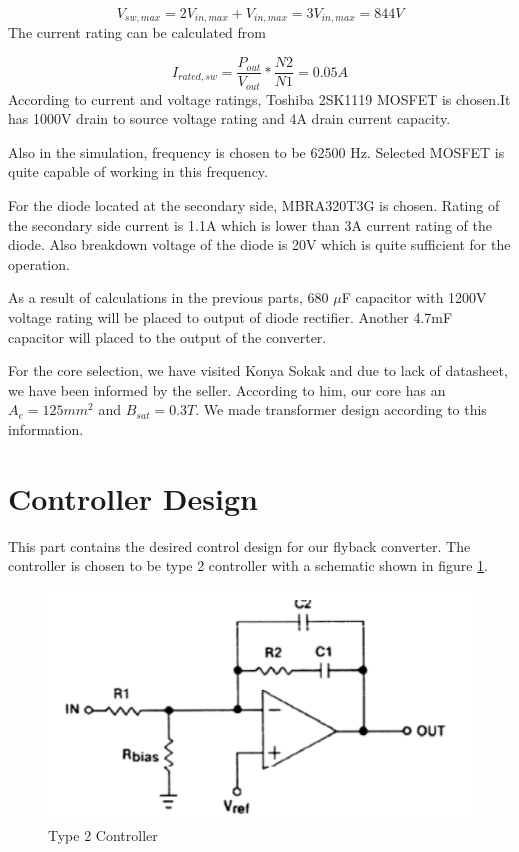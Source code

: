 \documentclass[12pt]{article}
\begin{document}
\begin{equation*}
    V_{sw,max}=2 V_{in,max}+ V_{in,max}=3V_{in,max}=844 V
\end{equation*}
The current rating can be calculated from

\begin{equation*}
    I_{rated,sw}=\dfrac{P_{out}}{V_{out}}*\dfrac{N2}{N1}=0.05A
\end{equation*}
According to current and voltage ratings, Toshiba 2SK1119 MOSFET is chosen.It has 1000V drain to source voltage rating and 4A drain current capacity.

Also in the simulation, frequency is chosen to be 62500 Hz. Selected MOSFET is quite capable of working in this frequency.

For the diode located at the secondary side, MBRA320T3G is chosen. Rating of the secondary side current is 1.1A which is lower than 3A current rating of the diode. Also breakdown voltage of the diode is 20V which is quite sufficient for the operation. 

As a result of calculations in the previous parts, 680 $\mu$F capacitor with 1200V voltage rating will be placed to output of diode rectifier. Another 4.7mF capacitor will placed to the output of the converter.  

For the core selection, we have visited Konya Sokak and due to lack of datasheet, we have been informed by the seller. According to him, our core has an $A_{e}=125mm^2$ and $B_{sat}=0.3T$. We made transformer design according to this information. 

\section{Controller Design}

This part contains the desired control design for our flyback converter. The controller is chosen to be type 2 controller with a schematic shown in figure \ref{fig:controller}.
\begin{figure}[H]
    \centering
    \includegraphics[width=15 cm]{controller}
    \caption{Type 2 Controller}
    \label{fig:controller}
\end{figure}
\end{document}

